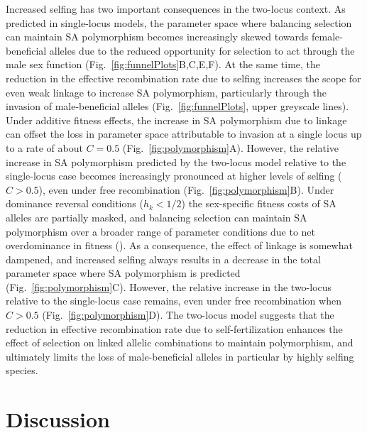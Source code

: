 \documentclass{article}
\begin{document}
Increased selfing has two important consequences in the two-locus context. As predicted in single-locus models, the parameter space where balancing selection can maintain SA polymorphism becomes increasingly skewed towards female-beneficial alleles due to the reduced opportunity for selection to act through the male sex function (Fig.~\ref{fig:funnelPlots}B,C,E,F). At the same time, the reduction in the effective recombination rate due to selfing increases the scope for even weak linkage to increase SA polymorphism, particularly through the invasion of male-beneficial alleles (Fig.~\ref{fig:funnelPlots}, upper greyscale lines). 
Under additive fitness effects, the increase in SA polymorphism due to linkage can offset the loss in parameter space attributable to invasion at a single locus up to a rate of about $C = 0.5$ (Fig.~\ref{fig:polymorphism}A). However, the relative increase in SA polymorphism predicted by the two-locus model relative to the single-locus case becomes increasingly pronounced at higher levels of selfing ($C > 0.5$), even under free recombination (Fig.~\ref{fig:polymorphism}B). Under dominance reversal conditions ($h_k < 1/2$) the sex-specific fitness costs of SA alleles are partially masked, and balancing selection can maintain SA polymorphism over a broader range of parameter conditions due to net overdominance in fitness (\citealt{ConnClark2012, ConnClark2014}). As a consequence, the effect of linkage is somewhat dampened, and increased selfing always results in a decrease in the total parameter space where SA polymorphism is predicted (Fig.~\ref{fig:polymorphism}C). However, the relative increase in the two-locus relative to the single-locus case remains, even under free recombination when $C > 0.5$ (Fig.~\ref{fig:polymorphism}D). The two-locus model suggests that the reduction in effective recombination rate due to self-fertilization enhances the effect of selection on linked allelic combinations to maintain polymorphism, and ultimately limits the loss of male-beneficial alleles in particular by highly selfing species.



\section*{Discussion}
\end{document}
